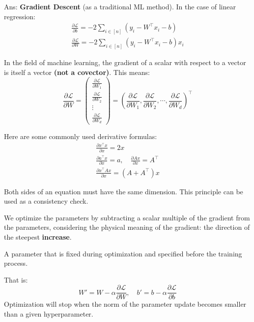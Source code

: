 \documentclass[../main]{subfiles}
\begin{document}
\noindent Ans: \textbf{Gradient Descent} (as a traditional ML method). In the case of linear regression:
\begin{gather}
  \frac{\partial \mathcal L}{\partial b}=-2\sum_{i\in[n]}(y_i-W^\top x_i-b)\\
  \frac{\partial \mathcal L}{\partial W}=-2\sum_{i\in[n]}(y_i-W^\top x_i-b)x_i
\end{gather}
\begin{note}
  In the field of machine learning, the gradient of a scalar with respect to a vector is itself a vector \textbf{(not a covector)}. This means:
  \begin{equation}
    \frac{\partial \mathcal L}{\partial W}=\begin{pmatrix}
      \frac{\partial \mathcal L}{\partial W_1}\\
      \frac{\partial \mathcal L}{\partial W_2}\\
      \vdots\\
      \frac{\partial \mathcal L}{\partial W_d}
    \end{pmatrix}=\left(\frac{\partial \mathcal L}{\partial W_1},
    \frac{\partial \mathcal L}{\partial W_2},
    \cdots,
    \frac{\partial \mathcal L}{\partial W_d}\right)^\top
  \end{equation}
\end{note}
\begin{note}
  Here are some commonly used derivative formulas:
  \begin{gather}
    \frac{\partial x^\top x}{\partial x}=2x\\
    \frac{\partial a^\top x}{\partial x}=a,\quad \frac{\partial Ax}{\partial x}=A^\top\\
    \frac{\partial x^\top Ax}{\partial x}=(A+A^\top)x
  \end{gather}
\end{note}
\begin{remark}
  Both sides of an equation must have the same dimension. This principle can be used as a consistency check.
\end{remark}
We optimize the parameters by subtracting a scalar multiple of the gradient from the parameters, considering the physical meaning of the gradient: the direction of the steepest \textbf{increase}.
\begin{definition}[Hyperparameter]
    A parameter that is fixed during optimization and specified before the training process.
\end{definition} 
That is:
\begin{equation}
    W'=W-\alpha\frac{\partial\mathcal L}{\partial W },\quad b'=b-\alpha\frac{\partial \mathcal L}{\partial b}
\end{equation}
Optimization will stop when the norm of the parameter update becomes smaller than a given hyperparameter.
\end{document}

